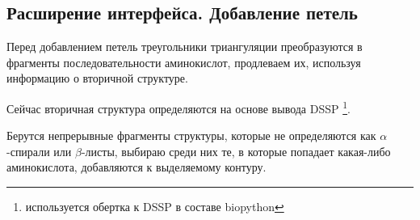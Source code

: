 \subsection{Расширение интерфейса. Добавление петель}

Перед добавлением петель треугольники триангуляции преобразуются в фрагменты последовательности аминокислот, продлеваем их, используя информацию о вторичной структуре.



Сейчас вторичная структура определяются на основе вывода DSSP \footnote{используется обертка к DSSP в составе biopython}.

Берутся непрерывные фрагменты структуры, которые не определяются как $\alpha$-спирали или $\beta$-листы, выбираю среди них те, в которые попадает какая-либо аминокислота, добавляются к выделяемому контуру.











